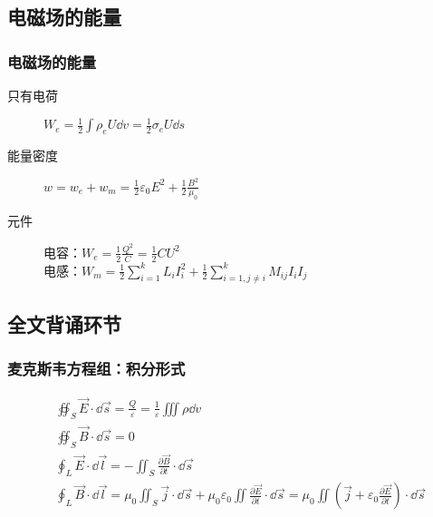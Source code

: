 \documentclass{ctexbeamer}
\begin{document}
\subsection{电磁场的能量}

\begin{frame}[c]
    \frametitle{电磁场的能量}

    \begin{description}
        \item[只有电荷] $W_e=\frac{1}{2}\int\rho_eU\dd v=\frac{1}{2}\sigma_eU\dd s$
        \item[能量密度] $w=w_e+w_m=\frac{1}{2}\varepsilon_0 E^2+\frac{1}{2}\frac{B^2}{\mu_0}$
        \item[元件] 电容：$W_e=\frac{1}{2}\frac{Q^2}{C}=\frac{1}{2}CU^2$\\电感：$W_m=\frac{1}{2}\sum^k_{i=1}L_iI_i^2+\frac{1}{2}\sum^k_{i=1, j\neq i}M_{ij}I_iI_j$
    \end{description}
\end{frame}

\subsection{全文背诵环节}

\begin{frame}[c]
    \frametitle{麦克斯韦方程组：积分形式}

    $$\begin{aligned}
             & \oiint_S\vec{E}\cdot\dd\vec{s}=\frac{Q}{\varepsilon}=\frac{1}{\varepsilon}\iiint\rho\dd v                                                                                                                                    \\
             & \oiint_S\vec{B}\cdot\dd\vec{s}=0                                                                                                                                                                                             \\
             & \oint_L\vec{E}\cdot\dd\vec{l}=-\iint_S\frac{\partial\vec{B}}{\partial t}\cdot\dd\vec{s}                                                                                                                                      \\
             & \oint_L\vec{B}\cdot\dd\vec{l}=\mu_0\iint_S\vec{j}\cdot\dd\vec{s}+\mu_0\varepsilon_0\iint\frac{\partial\vec{E}}{\partial t}\cdot\dd\vec{s}=\mu_0\iint(\vec{j}+\varepsilon_0\frac{\partial\vec{E}}{\partial t})\cdot\dd\vec{s}
        \end{aligned}$$
\end{frame}
\end{document}
